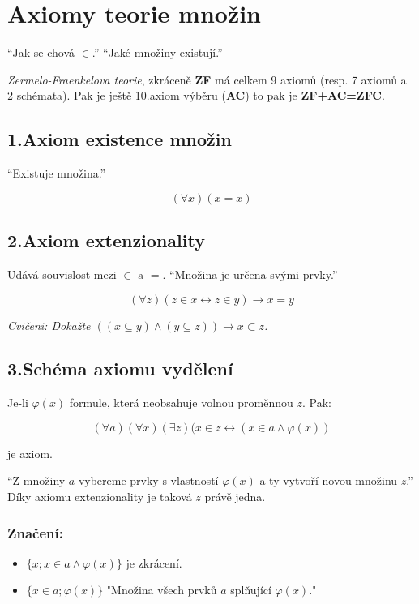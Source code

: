 \chapter{Axiomy teorie množin}

“Jak se chová $\in$.” “Jaké množiny existují.”

\textit{Zermelo-Fraenkelova teorie}, zkráceně \textbf{ZF} má celkem 9 axiomů (resp. 7 axiomů a 2 schémata). Pak je ještě 10.axiom výběru (\textbf{AC}) to pak je \textbf{ZF+AC=ZFC}.

\section{1.Axiom existence množin}

“Existuje množina.”

$$
(\forall x)(x=x)
$$

\section{2.Axiom extenzionality}

Udává souvislost mezi $\in \text{ a } =$. “Množina je určena svými prvky.”

$$
(\forall z)(z \in x \leftrightarrow z \in y) \rightarrow x = y
$$

\textit{Cvičeni: Dokažte $((x \subseteq y) \land (y \subseteq z)) \rightarrow x \subset z$.}

\section{3.Schéma axiomu vydělení}

Je-li $\varphi(x)$ formule, která neobsahuje volnou proměnnou $z$. Pak:

$$
(\forall a)(\forall x)(\exists z)(x \in z \leftrightarrow (x \in a \land \varphi(x)) 
$$

je axiom.

“Z množiny $a$ vybereme prvky s vlastností $\varphi(x)$ a ty vytvoří novou množinu $z$.” Díky axiomu extenzionality je taková $z$ právě jedna.

\subsection{Značení:}

\begin{itemize}
	\item $\{x; x \in a \land \varphi(x)\}$ je zkrácení.
	\item $\{x \in a; \varphi(x)\}$ "Množina všech prvků $a$ splňující $\varphi(x).$"
\end{itemize}

